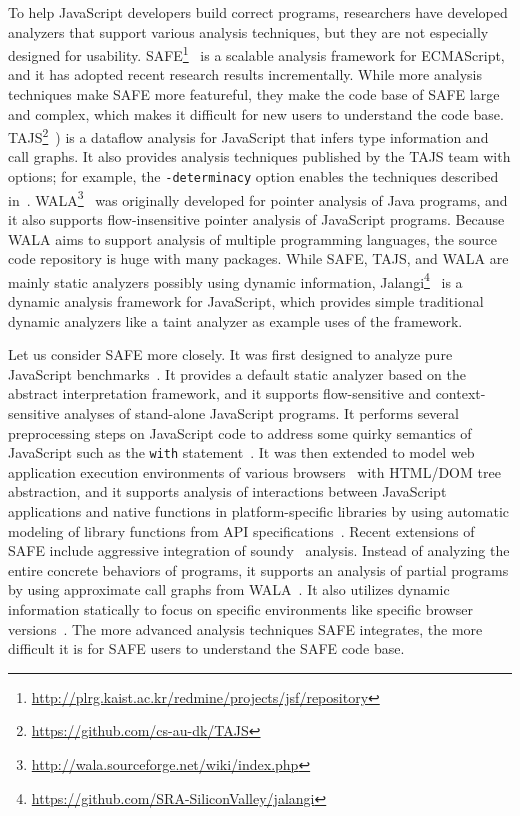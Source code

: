 \documentclass[10pt, conference]{IEEEtran}
\begin{document}
To help JavaScript developers build correct programs, researchers
have developed analyzers that support various analysis techniques,
but they are not especially designed for usability.
SAFE\footnote{\url{http://plrg.kaist.ac.kr/redmine/projects/jsf/repository}}~\cite{Lee12}
is a scalable analysis framework for ECMAScript, and it has adopted recent research results incrementally.
While more analysis techniques make SAFE more featureful,
they make the code base of SAFE large and complex, which makes it
difficult for new users to understand the code base.
TAJS\footnote{\url{https://github.com/cs-au-dk/TAJS}}~\cite{TAJSDETER})
is a dataflow analysis for JavaScript that infers type information and call graphs.
It also provides analysis techniques published by the TAJS team with options;
for example, the {\tt -determinacy} option enables the techniques described in~\cite{TAJSDETER}.
WALA\footnote{\url{http://wala.sourceforge.net/wiki/index.php}}~\cite{Schafer13}
was originally developed for pointer analysis of Java programs, and it
also supports flow-insensitive pointer analysis of JavaScript programs.
Because WALA aims to support analysis of multiple programming languages,
the source code repository is huge with many packages.
While SAFE, TAJS, and WALA are mainly static analyzers possibly using dynamic information,
Jalangi\footnote{\url{https://github.com/SRA-SiliconValley/jalangi}}~\cite{Sen13}
is a dynamic analysis framework for JavaScript, which provides simple
traditional dynamic analyzers like a taint analyzer as example uses of the framework.


Let us consider SAFE more closely.  It was first designed to analyze pure
JavaScript benchmarks~\cite{Lee12}.  It provides a default static analyzer
based on the abstract interpretation framework, and it supports
flow-sensitive and context-sensitive analyses of stand-alone JavaScript
programs.  It performs several preprocessing steps on JavaScript code to
address some quirky semantics of JavaScript such as the {\tt with}
statement~\cite{dls13}.
It was then extended to model web application execution environments
of various browsers~\cite{safewapp} with HTML/DOM tree abstraction,
and it supports analysis of interactions between JavaScript applications
and native functions in platform-specific libraries by using automatic
modeling of library functions from API specifications~\cite{SAFEWAPI}.
Recent extensions of SAFE include aggressive integration of
soundy~\cite{soundy} analysis.  Instead of analyzing the entire concrete
behaviors of programs, it supports an analysis of partial
programs by using approximate call graphs from WALA~\cite{asewala}.
It also utilizes dynamic information statically to focus on specific
environments like specific browser versions~\cite{safehybrid}.
The more advanced analysis techniques SAFE integrates,
the more difficult it is for SAFE users to understand the SAFE code base.
\end{document}
